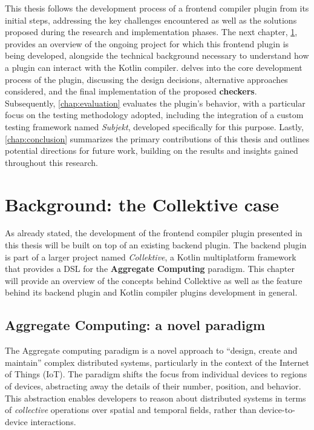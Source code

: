 \documentclass[12pt,a4paper,openright,twoside]{book}
\begin{document}
This thesis follows the development process of a frontend compiler plugin from
its initial steps, addressing the key challenges encountered as well as the
solutions proposed during the research and implementation phases. The next
chapter, \cref{chap:background}, provides an overview of the ongoing project for
which this frontend plugin is being developed, alongside the technical
background necessary to understand how a plugin can interact with the Kotlin
compiler.
%
 delves into the core development process of the plugin,
discussing the design decisions, alternative approaches considered, and the
final implementation of the proposed \textbf{checkers}. Subsequently,
\cref{chap:evaluation} evaluates the plugin’s behavior, with a particular focus
on the testing methodology adopted, including the integration of a custom
testing framework named \emph{Subjekt}, developed specifically for this purpose.
%
Lastly, \cref{chap:conclusion} summarizes the primary contributions of this
thesis and outlines potential directions for future work, building on the
results and insights gained throughout this research.

\chapter{Background: the Collektive case}
\label{chap:background}

As already stated, the development of the frontend compiler plugin presented in
this thesis will be built on top of an existing backend plugin. The backend
plugin is part of a larger project named \emph{Collektive}, a Kotlin
multiplatform framework that provides a \ac{DSL} for the \textbf{Aggregate
Computing} \cite{Beal2015} paradigm. This chapter will provide an overview of
the concepts behind Collektive as well as the feature behind its backend plugin
and Kotlin compiler plugins development in general.

\section{Aggregate Computing: a novel paradigm}

The Aggregate computing paradigm is a novel approach to ``design, create and
maintain'' \cite{Beal2015} complex distributed systems, particularly in the 
context of the Internet of Things (IoT). The paradigm shifts the focus from
individual devices to regions of devices, abstracting away the details of their
number, position, and behavior. This abstraction enables developers to reason
about distributed systems in terms of \emph{collective} operations over spatial and
temporal fields, rather than device-to-device interactions. 
\end{document}
